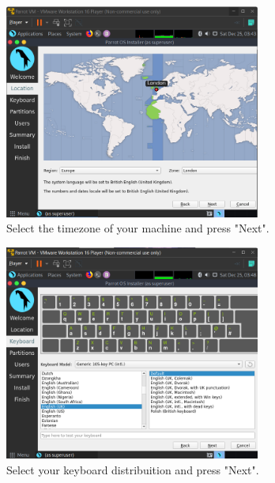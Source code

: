 \documentclass[a4paper]{article}
\begin{document}
    \vfill

    \begin{figure}[h!]
        \centering
        \includegraphics[width=0.75\textwidth]{Images/Install_OS/OS_4.png}
        \caption{Select the timezone of your machine and press "Next".}
    \end{figure}

    \clearpage
    \begin{figure}[h]
        \centering
        \includegraphics[width=0.75\textwidth]{Images/Install_OS/OS_5.png}
        \caption{Select your keyboard distribuition and press "Next".}
    \end{figure}

    \vfill
\end{document}
